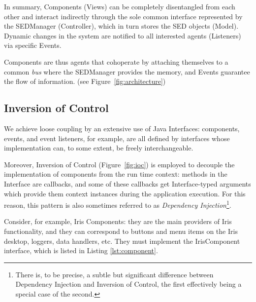 \documentclass[final,5p]{elsarticle}
\begin{document}
In summary, Components (Views) can be completely disentangled from each other and interact indirectly through the sole common interface represented by the SEDManager (Controller), which in turn stores the SED objects (Model). Dynamic changes in the system are notified to all interested agents (Listeners) via specific Events.

Components are thus agents that cohoperate by attaching themselves to a common \emph{bus} where the SEDManager provides the memory, and Events guarantee the flow of information. (see Figure~\ref{fig:architecture})

\subsection{Inversion of Control}

We achieve loose coupling by an extensive use of Java Interfaces: components, events, and event listeners, for example, are all defined by interfaces whose implementation can, to some extent, be freely interchangeable.

Moreover, Inversion of Control (Figure~\ref{fig:ioc}) is employed to decouple the implementation of components from the run time context: methods in the Interface are callbacks, and some of these callbacks get Interface-typed arguments which provide them context instances during the application execution. For this reason, this pattern is also sometimes referred to as \emph{Dependency Injection}\footnote{There is, to be precise, a subtle but significant difference between Dependency Injection and Inversion of Control, the first effectively being a special case of the second.}.

Consider, for example, Iris Components: they are the main providers of Iris functionality, and they can correspond to buttons and menu items on the Iris desktop, loggers, data handlers, etc. They must implement the IrisComponent interface, which is listed in Listing \ref{lst:component}.
\end{document}
